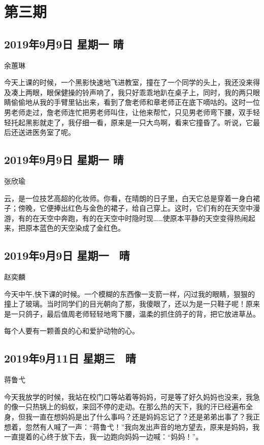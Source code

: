 \chapter{第三期}

\section{2019年9月9日 星期一 晴}

余蕙琳

今天上课的时候，一个黑影快速地飞进教室，撞在了一个同学的头上，我还没来得及凑上两眼，眼保健操的铃声响了，我只好乖乖地趴在桌子上，同时，我的两只眼睛偷偷地从我的手臂里钻出来，看到了詹老师和章老师正在底下嘀咕的。这时一位男老师走过，詹老师连忙把男老师叫住，让他来帮忙，只见男老师弯下腰，双手轻轻托起黑影就走了，我仔细一看，原来是一只大鸟啊，看来它撞昏了。听说，它最后还送进医务室了呢。

\section{2019年9月9日 星期一 晴}

张欣瑜

云，是一位技艺高超的化妆师。你看，在晴朗的日子里，白天它总是穿着一身白裙子；傍晚，它便捧出红色与金色的裙子，给自己穿上。这时，它们有的在天空中漫游，有的在天空中奔跑，有的在天空中时隐时现\ldots{}\ldots{}使原本平静的天空变得热闹起来，把原本蓝色的天空染成了金红色。

\section{2019年9月9日 星期一~ 晴}

赵奕麟

今天中午,快下课的时候。一个模糊的东西像一支箭一样，闪过我的眼睛，狠狠的撞上了玻璃。当时同学们的目光朝向了那，我傻眼了，还以为是一只鞋子呢！原来是一只鸽子，最后值周老师轻轻地弯下腰，温柔的抓住鸽子的背，把它放进草丛。

每个人要有一颗善良的心和爱护动物的心。

\section{2019年9月11日 星期三~ 晴}

蒋鲁弋

今天我放学的时候，我站在校门口等站着等妈妈，可是等了好久妈妈也没来，我急的像一只热锅上的蚂蚁，来回不停的走动。在那么热的天下，我的汗已经遍布全身，但我一直在想妈妈是出了什么事吗？还是妈妈忘记了？还是弟弟出事了？我正想着，忽然有人喊了一声：``蒋鲁弋！''我向发出声音的地方望去，原来是妈妈，我一直提着的心终于放下去，我一边跑向妈妈一边喊：``妈妈！''。

